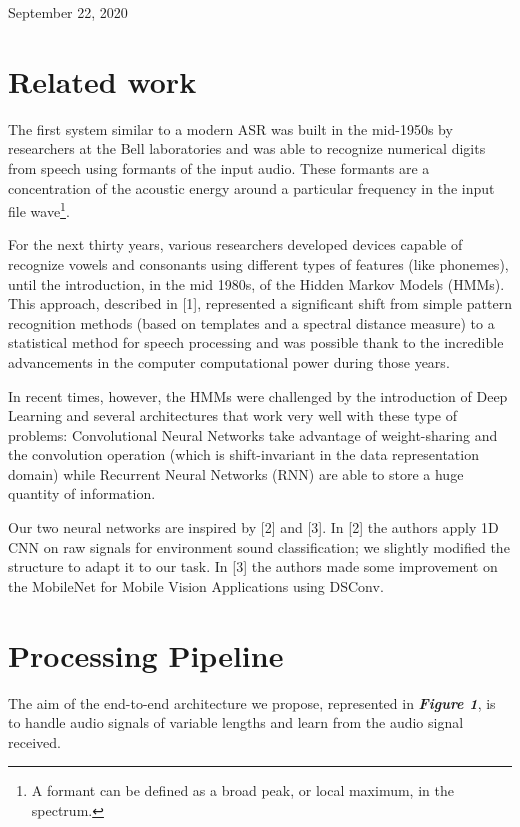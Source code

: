 \documentclass[conference]{IEEEtran}
\begin{document}
\hfill September 22, 2020

\section{Related work}
The first system similar to a modern ASR was built in the mid-1950s by researchers at the Bell laboratories and was able to recognize numerical digits from speech using formants of the input audio. These formants are a concentration of the acoustic energy around a particular frequency in the input file wave\footnote{A formant can be defined as a broad peak, or local maximum, in the spectrum.}. 

For the next thirty years, various researchers developed devices capable of recognize vowels and consonants using different types of features (like phonemes), until the introduction, in the mid 1980s, of the Hidden Markov Models (HMMs). This approach, described in [1], represented a significant shift from simple pattern recognition methods (based on templates and a spectral distance measure) to a statistical method for speech processing and was possible thank to the incredible advancements in the computer computational power during those years.

In recent times, however, the HMMs were challenged by the introduction of Deep Learning and several architectures that work very well with these type of problems: Convolutional Neural Networks take advantage of weight-sharing and the convolution operation (which is shift-invariant in the data representation domain) while Recurrent Neural Networks (RNN) are able to store a huge quantity of information.

Our two neural networks are inspired by [2] and [3]. In [2] the authors apply 1D CNN on raw signals for environment sound classification; we slightly modified the structure to adapt it to our task. In [3] the authors made some improvement on the MobileNet for Mobile Vision Applications using DSConv. 
\hfill
\section{Processing Pipeline}
The aim of the end-to-end architecture we propose, represented in \textbf{\textit{Figure 1}}, is to handle audio signals of variable lengths and learn from the audio signal received.
\end{document}
